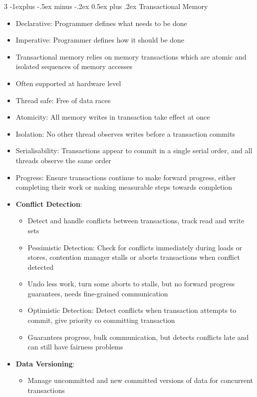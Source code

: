 \documentclass[10pt, landscape]{article}
\makeatletter
\renewcommand{\section}{\@startsection{section}{1}{0mm}%
                                {-1ex plus -.5ex minus -.2ex}%
                                {0.5ex plus .2ex}%
                                {\normalfont\large\bfseries}}
\renewcommand{\section}{\@startsection{section}{2}{0mm}%
                                {-1explus -.5ex minus -.2ex}%
                                {0.5ex plus .2ex}%
                                {\normalfont\normalsize\bfseries}}
\makeatother
\begin{document}
\begin{multicols*}{3}
\section{Transactional Memory}
\begin{itemize}
    \item Declarative: Programmer defines what needs to be done
    \item Imperative: Programmer defines how it should be done
    \item Transactional memory relies on memory transactions which are atomic and isolated sequences of memory accesses
    \item Often supported at hardware level
    \item Thread safe: Free of data races
    \item Atomicity: All memory writes in transaction take effect at once
    \item Isolation: No other thread observes writes before a transaction commits
    \item Serialisability: Transactions appear to commit in a single serial order, and all threads observe the same order
    \item Progress: Ensure transactions continue to make forward progress, either completing their work or making measurable steps towards completion
    \item \textbf{Conflict Detection}:
    \begin{itemize}
        \item Detect and handle conflicts between transactions, track read and write sets
        \item Pessimistic Detection: Check for conflicts immediately during loads or stores, contention manager stalls or aborts transactions when conflict detected
        \item Undo less work, turn some aborts to stalls, but no forward progress guarantees, needs fine-grained communication
        \item Optimistic Detection: Detect conflicts when transaction attempts to commit, give priority co committing transaction
        \item Guarantees progress, bulk communication, but detects conflicts late and can still have fairness problems
    \end{itemize}
    \item \textbf{Data Versioning}:
    \begin{itemize}
        \item Manage uncommitted and new committed versions of data for concurrent transactions

\end{itemize}
\end{itemize}
\end{multicols*}
\end{document}
